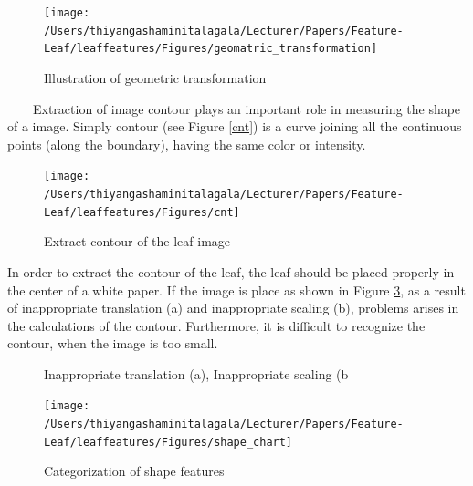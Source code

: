 \documentclass{article}
\begin{document}
\begin{figure}[!ht]

{\centering \texttt{[image: /Users/thiyangashaminitalagala/Lecturer/Papers/Feature-Leaf/leaffeatures/Figures/geomatric\_transformation]} 

}

\caption{\label{img3} Illustration of geometric transformation}\label{fig:unnamed-chunk-5}
\end{figure}

~~~~Extraction of image contour plays an important role in measuring the
shape of a image. Simply contour (see Figure \ref{cnt}) is a curve
joining all the continuous points (along the boundary), having the same
color or intensity.

\begin{figure}[!ht]

{\centering \texttt{[image: /Users/thiyangashaminitalagala/Lecturer/Papers/Feature-Leaf/leaffeatures/Figures/cnt]} 

}

\caption{\label{cnt}Extract contour of the leaf image}\label{fig:unnamed-chunk-6}
\end{figure}

In order to extract the contour of the leaf, the leaf should be placed
properly in the center of a white paper. If the image is place as shown
in Figure \ref{fig:trans}, as a result of inappropriate translation (a)
and inappropriate scaling (b), problems arises in the calculations of
the contour. Furthermore, it is difficult to recognize the contour, when
the image is too small.

\begin{figure}[!ht]

{\centering {}

}

\caption{\label{trans}Inappropriate translation (a),  Inappropriate scaling (b}\label{fig:trans}
\end{figure}

\begin{figure}[!ht]

{\centering \texttt{[image: /Users/thiyangashaminitalagala/Lecturer/Papers/Feature-Leaf/leaffeatures/Figures/shape\_chart]} 

}

\caption{\label{scalimg4}Categorization of shape features}\label{fig:unnamed-chunk-7}
\end{figure}
\end{document}
